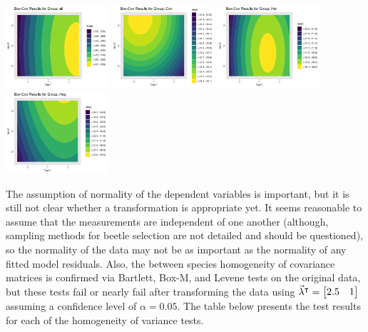 \begin{center}
	\includegraphics[width=1.5in]{1_bxcx_all.png}
	\includegraphics[width=1.5in]{1_bxcx_Con.png}
	\includegraphics[width=1.5in]{1_bxcx_Hei.png}
	\includegraphics[width=1.5in]{1_bxcx_Hep.png}
\end{center}

	The assumption of normality of the dependent variables is important, but it is still not clear whether a transformation is appropriate yet. It seems reasonable to assume that the measurements are independent of one another (although, sampling methods for beetle selection are not detailed and should be questioned), so the normality of the data may not be as important as the normality of any fitted model residuals. Also, the between species homogeneity of covariance matrices is confirmed via Bartlett, Box-M, and Levene tests on the original data, but these tests fail or nearly fail after transforming the data using $\vec{\lambda}^{\intercal} = \m{2.5 & 1}$ assuming a confidence level of $\alpha = 0.05$. The table below presents the test results for each of the homogeneity of variance tests.


